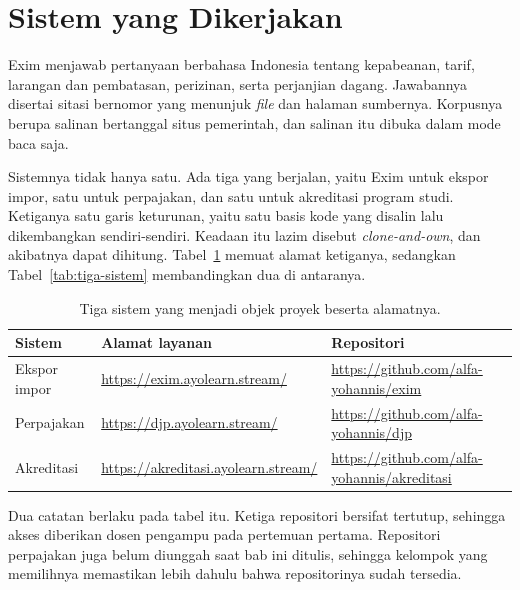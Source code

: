 \section{Sistem yang Dikerjakan}

Exim menjawab pertanyaan berbahasa Indonesia tentang kepabeanan, tarif,
larangan dan pembatasan, perizinan, serta perjanjian dagang. Jawabannya
disertai sitasi bernomor yang menunjuk \textit{file} dan halaman sumbernya. Korpusnya
berupa salinan bertanggal situs pemerintah, dan salinan itu dibuka dalam mode
baca saja.

Sistemnya tidak hanya satu. Ada tiga yang berjalan, yaitu Exim untuk ekspor
impor, satu untuk perpajakan, dan satu untuk akreditasi program studi.
Ketiganya satu garis keturunan, yaitu satu basis kode yang disalin lalu
dikembangkan sendiri-sendiri. Keadaan itu lazim disebut \textit{clone-and-own},
dan akibatnya dapat dihitung. Tabel~\ref{tab:alamat-sistem} memuat alamat
ketiganya, sedangkan Tabel~\ref{tab:tiga-sistem} membandingkan dua di antaranya.

\begin{table}[htbp]
  \centering
  \caption{Tiga sistem yang menjadi objek proyek beserta alamatnya.}
  \label{tab:alamat-sistem}
  \begin{tabularx}{\textwidth}{|l|X|X|}
    \hline
    \textbf{Sistem} & \textbf{Alamat layanan} & \textbf{Repositori} \\
    \hline
    Ekspor impor & \url{https://exim.ayolearn.stream/} & \url{https://github.com/alfa-yohannis/exim} \\
    \hline
    Perpajakan & \url{https://djp.ayolearn.stream/} & \url{https://github.com/alfa-yohannis/djp} \\
    \hline
    Akreditasi & \url{https://akreditasi.ayolearn.stream/} & \url{https://github.com/alfa-yohannis/akreditasi} \\
    \hline
  \end{tabularx}
\end{table}

Dua catatan berlaku pada tabel itu. Ketiga repositori bersifat tertutup,
sehingga akses diberikan dosen pengampu pada pertemuan pertama. Repositori
perpajakan juga belum diunggah saat bab ini ditulis, sehingga kelompok yang
memilihnya memastikan lebih dahulu bahwa repositorinya sudah tersedia.

